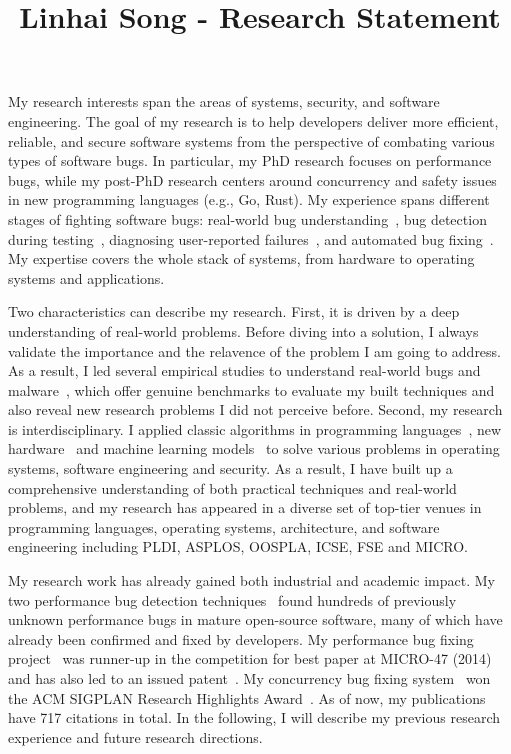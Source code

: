 \documentclass[10pt]{article}
\title{\vspace{-.7in}\bf{Linhai Song - Research Statement\vspace{-.4in}}}
\date{}
\begin{document}
\maketitle\vspace{-.2in}

My research interests span the areas of systems, security, and software engineering.
The goal of my research is to help developers deliver more efficient, reliable, and secure software systems
from the perspective of combating various types of software bugs.  
In particular, my PhD research focuses on performance bugs, while my post-PhD
research centers around concurrency and safety issues in new programming languages (e.g., Go, Rust).
My experience spans different stages of fighting software bugs:
real-world bug understanding~\cite{jin12perfbug,go-asplos,yu2019fearless,sosp-boqin}, 
bug detection during testing~\cite{jin12perfbug,Nistor13ICSE,icse-boqin}, 
diagnosing user-reported failures~\cite{Song14OOPSLA,Song17ICSE}, 
and automated bug fixing~\cite{jin11afix,Song14MICRO}. 
My expertise covers the whole stack of systems, 
from hardware to operating systems and applications. 

Two characteristics can describe my research. 
First, it is driven by a deep understanding of real-world problems. 
Before diving into a solution, 
I always validate the importance and the relavence of 
the problem I am going to address. 
As a result, I led several empirical studies to understand real-world bugs and 
malware~\cite{jin12perfbug,go-asplos,yu2019fearless,sosp-boqin,Song14OOPSLA,Song17ICSE,Song16ApSys}, 
which offer genuine benchmarks to evaluate my built techniques 
and also reveal new research problems I did not perceive before.
Second, my research is interdisciplinary.
I applied classic algorithms in programming languages~\cite{salad,icse-boqin,Song17ICSE}, 
new hardware~\cite{Song14MICRO,Song14OOPSLA} and 
machine learning models~\cite{Song16ApSys,Song14OOPSLA,vt-jianjun} 
to solve various problems 
in operating systems, software engineering and security. 
As a result, I have built up a comprehensive understanding of both 
practical techniques and real-world problems, and my research
has appeared in a diverse set of top-tier 
venues in programming languages, 
operating systems, architecture, and software engineering including 
PLDI, ASPLOS, OOSPLA, ICSE, FSE and MICRO.

My research work has already gained both industrial and academic impact. 
My two performance bug detection techniques~\cite{jin12perfbug, Nistor13ICSE} 
found hundreds of previously unknown performance bugs in mature open-source software, 
many of which have already been confirmed and fixed by developers. 
My performance bug fixing project~\cite{Song14MICRO} was 
runner-up in the competition 
for best paper at MICRO-47 (2014)
and has also led to an issued patent~\cite{comppatent}.
My concurrency bug fixing system~\cite{jin11afix} won 
the ACM SIGPLAN Research Highlights Award~\cite{afixnom}. 
As of now, my publications have 717 citations in total. 
In the following, I will describe my previous research experience 
and future research directions. 
\end{document}
